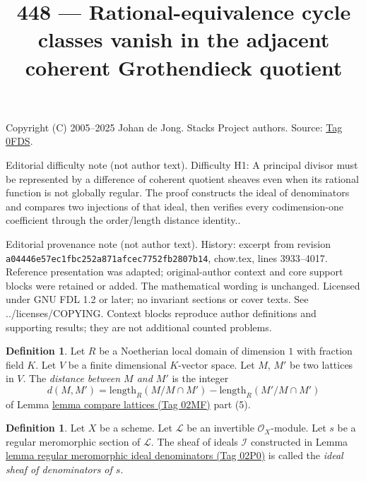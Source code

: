 \documentclass{amsart}
\theoremstyle{plain}
\theoremstyle{definition}
\newtheorem{definition}[subsection]{Definition}
\theoremstyle{remark}
\numberwithin{equation}{subsection}
\begin{document}
\title[Stacks Project, Tag 0FDS]{448 --- Rational-equivalence cycle classes vanish in the adjacent coherent Grothendieck quotient}
\maketitle
\noindent Copyright (C) 2005--2025 Johan de Jong. Stacks Project authors. Source: \href{https://stacks.math.columbia.edu/tag/0FDS}{Tag 0FDS}.

\noindent Editorial difficulty note (not author text). Difficulty H1: A principal divisor must be represented by a difference of coherent quotient sheaves even when its rational function is not globally regular. The proof constructs the ideal of denominators and compares two injections of that ideal, then verifies every codimension-one coefficient through the order/length distance identity..

\noindent Editorial provenance note (not author text). History: excerpt from revision \texttt{a0444\allowbreak 6e57e\allowbreak c1fbc\allowbreak 252a8\allowbreak 71afc\allowbreak ec775\allowbreak 2fb28\allowbreak 07b14}, chow.tex, lines 3933--4017. Reference presentation was adapted; original-author context and core support blocks were retained or added. The mathematical wording is unchanged. Licensed under GNU FDL 1.2 or later; no invariant sections or cover texts. See ../licenses/COPYING. Context blocks reproduce author definitions and supporting results; they are not additional counted problems.

\begin{definition}
\label{algebra-definition-distance}
Let $R$ be a Noetherian local domain of dimension $1$ with
fraction field $K$. Let $V$ be a finite dimensional $K$-vector space.
Let $M$, $M'$ be two lattices in $V$. The {\it distance between
$M$ and $M'$} is the integer
$$
d(M, M') = \text{length}_R(M/M \cap M') - \text{length}_R(M'/M \cap M')
$$
of Lemma \href{https://stacks.math.columbia.edu/tag/02MF}{lemma compare lattices (Tag 02MF)} part (5).
\end{definition}

\begin{definition}
\label{divisors-definition-regular-meromorphic-ideal-denominators}
Let $X$ be a scheme.
Let $\mathcal{L}$ be an invertible $\mathcal{O}_X$-module.
Let $s$ be a regular meromorphic section of $\mathcal{L}$.
The sheaf of ideals $\mathcal{I}$ constructed in
Lemma \href{https://stacks.math.columbia.edu/tag/02P0}{lemma regular meromorphic ideal denominators (Tag 02P0)}
is called the {\it ideal sheaf of denominators of $s$}.
\end{definition}
\end{document}
